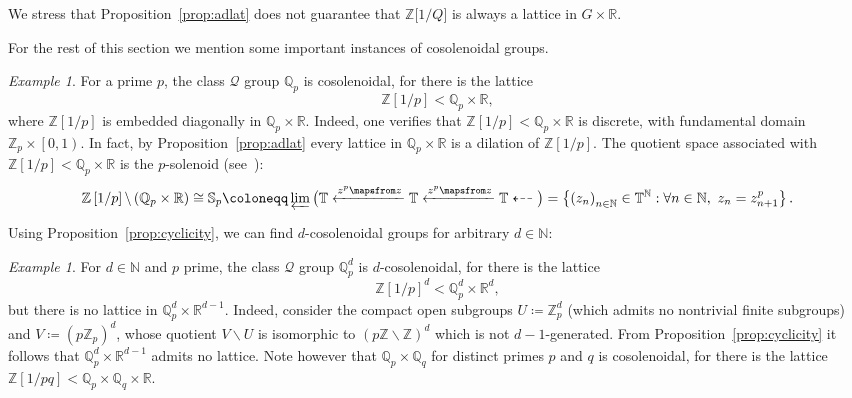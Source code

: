 \documentclass{amsart}
\numberwithin{equation}{subsection}
\theoremstyle{remark}
\newtheorem{exm}[thm]{Example}
\begin{document}
We stress that Proposition~\ref{prop:adlat} does not guarantee that \(\mathbb{Z}\big[1/Q\big]\) is always a lattice in \(G\times\mathbb{R}\).

For the rest of this section we mention some important instances of cosolenoidal groups.

\begin{exm}\label{exm:qp}
For a prime \(p\), the class \(\mathcal{Q}\) group \(\mathbb{Q}_{p}\) is cosolenoidal, for there is the lattice
\[\mathbb{Z}\left[1/p\right]<\mathbb{Q}_{p}\times \mathbb{R},\]
where \(\mathbb{Z}[1/p]\) is embedded diagonally in \(\mathbb{Q}_{p}\times \mathbb{R}\). Indeed, one verifies that \(\mathbb{Z}\left[1/p\right]<\mathbb{Q}_{p}\times\mathbb{R}\) is discrete, with fundamental domain \(\mathbb{Z}_{p}\times\left[0,1\right)\). In fact, by Proposition~\ref{prop:adlat} every lattice in \(\mathbb{Q}_{p}\times\mathbb{R}\) is a dilation of \(\mathbb{Z}\left[1/p\right]\). The quotient space associated with \(\mathbb{Z}\left[1/p\right]<\mathbb{Q}_{p}\times\mathbb{R}\) is the \(p\)-solenoid (see~\cite[pp. 114-115]{HewittRoss}):
\[\mathbb{Z}\left[1/p\right]\backslash\left(\mathbb{Q}_{p}\times\mathbb{R}\right)\cong\mathbb{S}_{p}\coloneqq\varprojlim\big(\mathbb{T}\xleftarrow{z^{p}\mapsfrom z}\mathbb{T}\xleftarrow{z^{p}\mapsfrom z}\mathbb{T}\dashleftarrow\big)=\left\{ \left(z_{n}\right)_{n\in\mathbb{N}}\in\mathbb{T}^{\mathbb{N}}:\forall n\in\mathbb{N},\,\,z_{n}=z_{n+1}^{p}\right\}.\]
\end{exm}

Using Proposition~\ref{prop:cyclicity}, we can find \(d\)-cosolenoidal groups for arbitrary \(d\in\mathbb{N}\):

\begin{exm}\label{exm:qp2}
For \(d\in\mathbb{N}\) and \(p\) prime, the class \(\mathcal{Q}\) group \(\mathbb{Q}_{p}^{d}\) is \(d\)-cosolenoidal, for there is the lattice
\[\mathbb{Z}\left[1/p\right]^{d}<\mathbb{Q}_{p}^{d}\times\mathbb{R}^{d},\]
but there is no lattice in \(\mathbb{Q}_{p}^{d}\times\mathbb{R}^{d-1}\). Indeed, consider the compact open subgroups \(U\coloneqq\mathbb{Z}_{p}^{d}\) (which admits no nontrivial finite subgroups) and \(V\coloneqq\left(p\mathbb{Z}_{p}\right)^{d}\), whose quotient \(V\backslash U\) is isomorphic to \(\left(p\mathbb{Z}\backslash\mathbb{Z}\right)^{d}\) which is not \(d-1\)-generated. From Proposition~\ref{prop:cyclicity} it follows that \(\mathbb{Q}_{p}^{d}\times\mathbb{R}^{d-1}\) admits no lattice. Note however that \(\mathbb{Q}_{p}\times\mathbb{Q}_{q}\) for distinct primes \(p\) and \(q\) is cosolenoidal, for there is the lattice \(\mathbb{Z}\left[1/pq\right]<\mathbb{Q}_{p}\times\mathbb{Q}_{q}\times\mathbb{R}\).
\end{exm}
\end{document}
